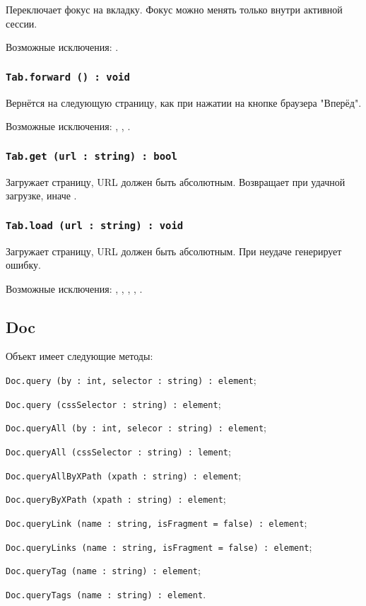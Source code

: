 Переключает фокус на вкладку. Фокус можно менять только внутри активной сессии.

Возможные исключения: .

\subsubsection{\lstinline|Tab.forward () : void|}

Вернётся на следующую страницу, как при нажатии на кнопке браузера "Вперёд".

Возможные исключения: , , .

\subsubsection{\lstinline|Tab.get (url : string) : bool|}

Загружает страницу, URL должен быть абсолютным. Возвращает \true{} при удачной загрузке, иначе \false.

\subsubsection{\lstinline|Tab.load (url : string) : void|}

Загружает страницу, URL должен быть абсолютным. При неудаче генерирует ошибку.

Возможные исключения: , , , , .

\subsection{{\color{orange} Doc}}

Объект \dom{} имеет следующие методы:
\begin{icItems}
	\item \lstinline|Doc.query (by : int, selector : string) : element|;
	\item \lstinline|Doc.query (cssSelector : string) : element|;
	\item \lstinline|Doc.queryAll (by : int, selecor : string) : element|;
	\item \lstinline|Doc.queryAll (cssSelector : string) : lement|;
	\item \lstinline|Doc.queryAllByXPath (xpath : string) : element|;
	\item \lstinline|Doc.queryByXPath (xpath : string) : element|;
	\item \lstinline|Doc.queryLink (name : string, isFragment = false) : element|;
	\item \lstinline|Doc.queryLinks (name : string, isFragment = false) : element|;
	\item \lstinline|Doc.queryTag (name : string) : element|;
	\item \lstinline|Doc.queryTags (name : string) : element|.
\end{icItems}

